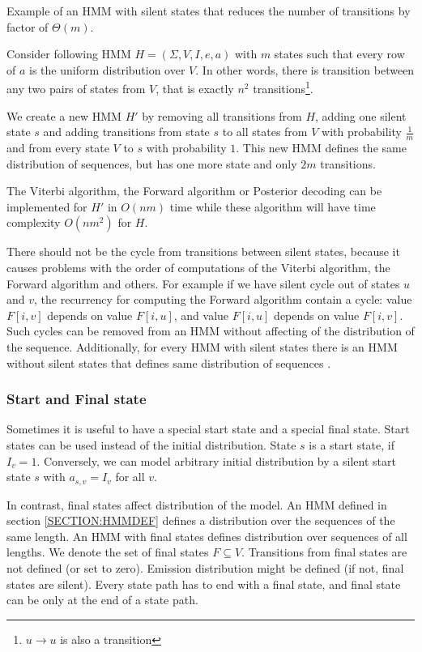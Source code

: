 \begin{example}
Example of an HMM with silent states that reduces the number of transitions by factor
of $\Theta(m)$.

Consider following HMM $H=(\Sigma,V,I,e,a)$ with $m$ states such that every row
of $a$ is the uniform distribution over $V$. In other words, there is transition
between any two pairs of states from $V$, that is exactly $n^2$
transitions\footnote{$u\to u$ is also a transition}.

We create a new HMM $H'$ by removing all transitions from $H$, adding one silent
state $s$ and adding transitions
from state $s$ to all states from $V$ with probability $\frac1m$  and from every
state $V$ to $s$ with probability $1$. This new HMM
defines the same distribution of sequences, but has one more state and only $2m$
transitions. 

The Viterbi algorithm, the Forward algorithm or Posterior decoding can be
implemented for $H'$ in $O(nm)$ time while these algorithm will have time
complexity $O(nm^2)$ for $H$.
\end{example}

There should not be the cycle from transitions between silent states, because
it causes problems with the order of computations of the Viterbi algorithm, the
Forward algorithm and others. For example if we have silent cycle out of states
$u$ and $v$, the recurrency for computing the Forward algorithm contain a
cycle: value $F[i, v]$ depends on value $F[i, u]$, and value $F[i,u]$ depends
on value $F[i, v]$.  Such cycles can be removed from an HMM without affecting
of the distribution of the sequence. Additionally, for every HMM with silent
states there is an HMM without silent states that defines same distribution of
sequences \cite{Nanasi2010mgr}.


\subsubsection{Start and Final state}

Sometimes it is useful to have a special start state and a special final state.
Start states can be used instead of the initial distribution. State $s$ is a start
state, if $I_v=1$. Conversely, we can model arbitrary initial distribution by a silent start state $s$
with $a_{s,v}=I_v$ for all $v$.

In contrast, final states affect distribution of the model. An HMM defined in section
\ref{SECTION:HMMDEF} defines a distribution over the sequences of the same length.
An HMM with
final states defines distribution over sequences of all lengths.  We denote the
set of final states $F\subseteq V$. Transitions from final states are not
defined (or set to zero). Emission distribution might be defined (if not, final
states are silent). Every state path has to end with a final state, and
final state can be only at the end of a state path.

